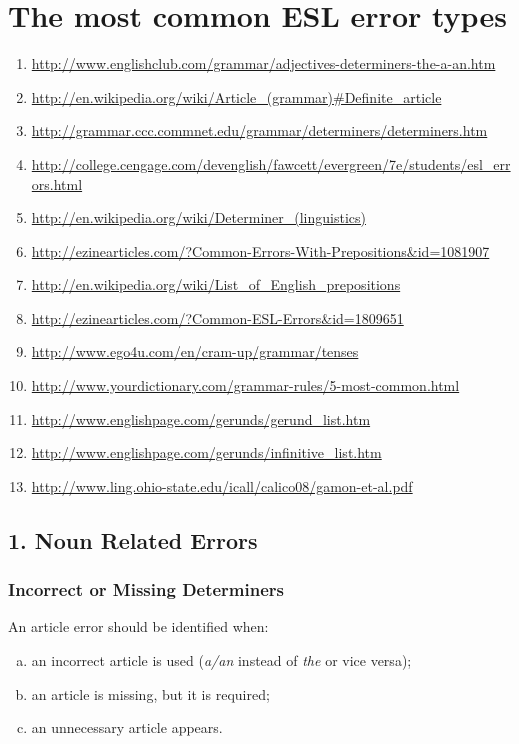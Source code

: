 \documentclass[12pt]{article}
\begin{document}
\section{The most common ESL error types}
\begin{enumerate}
\item \url{http://www.englishclub.com/grammar/adjectives-determiners-the-a-an.htm}\label{1}
\item \url{http://en.wikipedia.org/wiki/Article_(grammar)#Definite_article}\label{2}
\item \url{http://grammar.ccc.commnet.edu/grammar/determiners/determiners.htm}\label{3}
\item \url{http://college.cengage.com/devenglish/fawcett/evergreen/7e/students/esl_errors.html}\label{4}
\item \url{http://en.wikipedia.org/wiki/Determiner_(linguistics)}\label{5}
\item \url{http://ezinearticles.com/?Common-Errors-With-Prepositions&id=1081907}\label{7}
\item \url{http://en.wikipedia.org/wiki/List_of_English_prepositions}\label{8}
\item \url{http://ezinearticles.com/?Common-ESL-Errors&id=1809651}\label{9}
\item \url{http://www.ego4u.com/en/cram-up/grammar/tenses}\label{10}
\item \url{http://www.yourdictionary.com/grammar-rules/5-most-common.html}\label{11}
\item \url{http://www.englishpage.com/gerunds/gerund_list.htm}\label{12}
\item \url{http://www.englishpage.com/gerunds/infinitive_list.htm}\label{13}
\item \url{http://www.ling.ohio-state.edu/icall/calico08/gamon-et-al.pdf}

\end{enumerate}

\subsection{1. Noun Related Errors}
\subsubsection{Incorrect or Missing Determiners}
An article error should be identified when:
\begin{enumerate}[a)]
\item an incorrect article is used ({\it a/an} instead of {\it the} or vice versa);
\item an article is missing, but it is required;
\item an unnecessary article appears.
\end{enumerate}
\end{document}
